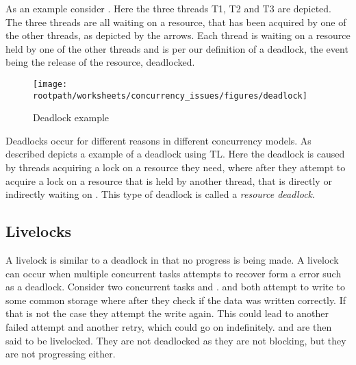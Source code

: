 As an example consider . Here the three threads T1, T2 and T3 are depicted. The three threads are all waiting on a resource, that has been acquired by one of the other threads, as depicted by the arrows. Each thread is waiting on a resource held by one of the other threads and is per our definition of a deadlock, the event being the release of the resource, deadlocked.
\begin{figure}[htbp]
\centering
 \texttt{[image: \\rootpath/worksheets/concurrency\_issues/figures/deadlock]} 
 \caption{Deadlock example}
\label{fig:deadlockexample}
\end{figure}

Deadlocks occur for different reasons in different concurrency models. As described  depicts a example of a deadlock using \ac{TL}. Here the deadlock is caused by threads acquiring a lock on a resource they need, where after they attempt to acquire a lock on a resource that is held by another thread, that is directly or indirectly waiting on . This type of deadlock is called a \emph{resource deadlock}\cite[p. 435]{tanenbaum2008modern}. 


\subsection{Livelocks} A livelock is similar to a deadlock in that no progress is being made. A livelock can occur when multiple concurrent tasks attempts to recover form a error such as a deadlock\cite[p. 457]{tanenbaum2008modern}. Consider two concurrent tasks  and .  and  both attempt to write to some common storage where after they check if the data was written correctly. If that is not the case they attempt the write again. This could lead to another failed attempt and another retry, which could go on indefinitely.  and  are then said to be livelocked. They are not deadlocked as they are not blocking, but they are not progressing either. 

